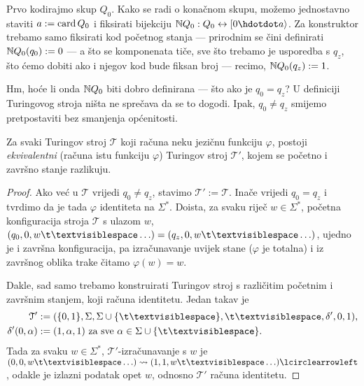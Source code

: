 
Prvo kodirajmo skup $Q_0$. Kako se radi o konačnom skupu, možemo jednostavno staviti $a:=\operatorname{card} Q_0$ i fiksirati bijekciju $\N Q_0:Q_0\leftrightarrow[0\dd a\rangle$. Za konstruktor trebamo samo fiksirati kod početnog stanja --- prirodnim se čini definirati ${\mathbb N} Q_0(q_0):=0$ --- a što se komponenata tiče, sve što trebamo je usporedba s $q_z$, što ćemo dobiti ako i njegov kod bude fiksan broj --- recimo, ${\mathbb N} Q_0(q_z):=1$.

Hm, hoće li onda ${\mathbb N} Q_0$ biti dobro definirana --- što ako je $q_0=q_z$? U definiciji Turingovog stroja ništa ne sprečava da se to dogodi. Ipak, $q_0\ne q_z$ smijemo pretpostaviti bez smanjenja općenitosti.

\begin{lema}[{name=[možemo pretpostaviti $q_0\ne q_z$]}]\label{lm:bsomp-q0neqz}
	Za svaki Turingov stroj $\mathcal T$ koji računa neku jezičnu funkciju $\varphi$, postoji \emph{ekvivalentni} (računa istu funkciju $\varphi$) Turingov stroj $\mathcal T'$, kojem se početno i završno stanje razlikuju.
\end{lema}
\begin{proof}
Ako već u $\mathcal T$ vrijedi $q_0\ne q_z$, stavimo $\mathcal T':=\mathcal T$. Inače vrijedi $q_0=q_z$ i tvrdimo da je tada $\varphi$ identiteta na $\Sigma^*$. Doista, za svaku riječ $w\in\Sigma^*$, početna konfiguracija stroja $\mathcal T$ s ulazom $w$, $(q_0,0,w\bl\ldots)=(q_z,0,w\bl\ldots)$, ujedno je i završna konfiguracija, pa izračunavanje uvijek stane ($\varphi$ je totalna) i iz završnog oblika trake čitamo $\varphi(w)=w$.

Dakle, sad samo trebamo konstruirati Turingov stroj s različitim početnim i za\-vrš\-nim stanjem, koji računa identitetu. Jedan takav je
\begin{align}
    \mathcal T'&:=(\{0,1\},\Sigma,\Sigma\cup\{\bl\},\bl,\delta',0,1)\text,\\
    \delta'(0,\alpha)&:=(1,\alpha,1)\text{ za sve $\alpha\in\Sigma\cup\{\bl\}$.}
\end{align}
Tada za svaku $w\in\Sigma^*$, $\mathcal T'$\!-izračunavanje s $w$ je $(0,0,w\bl\ldots)\leadsto(1,1,w\bl\ldots)\lcirclearrowleft$, odakle je izlazni podatak opet $w$, odnosno $\mathcal T'$ računa identitetu.
\end{proof}


